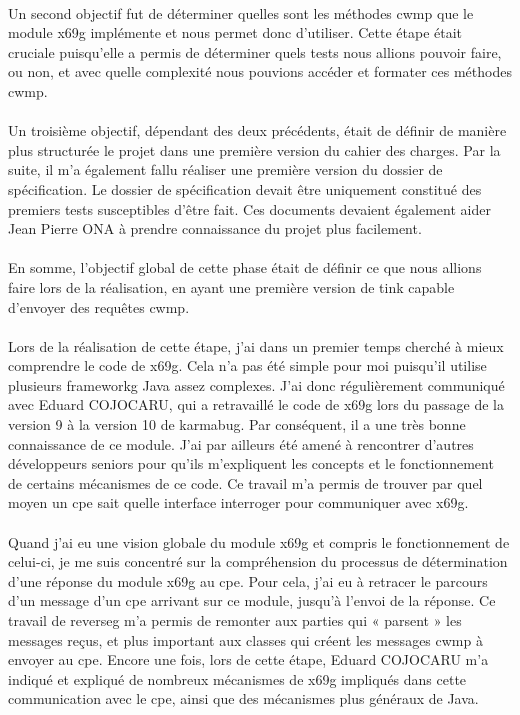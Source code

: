 \documentclass[12pt,a4paper]{report}
\begin{document}
\paragraph*{}Un second objectif fut de déterminer quelles sont les méthodes \gls{cwmp}
que le module \gls{x69g} implémente et nous permet donc d’utiliser. Cette étape était cruciale puisqu’elle a permis de déterminer quels tests nous allions pouvoir faire, ou non, et avec quelle complexité nous pouvions accéder et formater ces méthodes \gls{cwmp}.
\paragraph*{}Un troisième objectif, dépendant des deux précédents, était de définir de
manière plus structurée le projet dans une première version du cahier des charges. Par la suite, il m’a également fallu réaliser une première version du dossier de spécification. Le dossier de spécification devait être uniquement constitué des premiers tests susceptibles d’être fait. Ces documents devaient également aider Jean Pierre ONA à prendre connaissance du projet plus facilement.
\paragraph*{}En somme, l’objectif global de cette phase était de définir ce que nous
allions faire lors de la réalisation, en ayant une première version de \gls{tink} capable d’envoyer des requêtes \gls{cwmp}.
\paragraph*{}Lors de la réalisation de cette étape, j’ai dans un premier temps cherché
à mieux comprendre le code de \gls{x69g}. Cela n’a pas été simple pour moi puisqu’il utilise plusieurs \gls{frameworkg} Java assez complexes. J’ai donc régulièrement communiqué avec Eduard COJOCARU, qui a retravaillé le code de \gls{x69g} lors du passage de la version 9 à la version 10 de \gls{karmabug}. Par conséquent, il a une très bonne connaissance de ce module. J’ai par ailleurs été amené à rencontrer d’autres développeurs seniors pour qu’ils m’expliquent les concepts et le fonctionnement de certains mécanismes de ce code. Ce travail m’a permis de trouver par quel moyen un \gls{cpe} sait quelle interface interroger pour communiquer avec \gls{x69g}.
\paragraph*{} Quand j’ai eu une vision globale du module \gls{x69g} et compris le
fonctionnement de celui-ci, je me suis concentré sur la compréhension du processus de
détermination d’une réponse du module \gls{x69g} au \gls{cpe}. Pour cela, j’ai eu à retracer le parcours d’un message d’un \gls{cpe} arrivant sur ce module, jusqu’à l’envoi de la réponse. Ce travail de \gls{reverseg} m’a permis de remonter aux parties qui « parsent » les messages reçus, et plus important aux classes qui créent les messages \gls{cwmp} à envoyer au \gls{cpe}. Encore une fois, lors de cette étape, Eduard COJOCARU m’a indiqué et expliqué de nombreux mécanismes de \gls{x69g} impliqués dans cette communication avec le \gls{cpe}, ainsi que des mécanismes plus généraux de Java.
\end{document}
